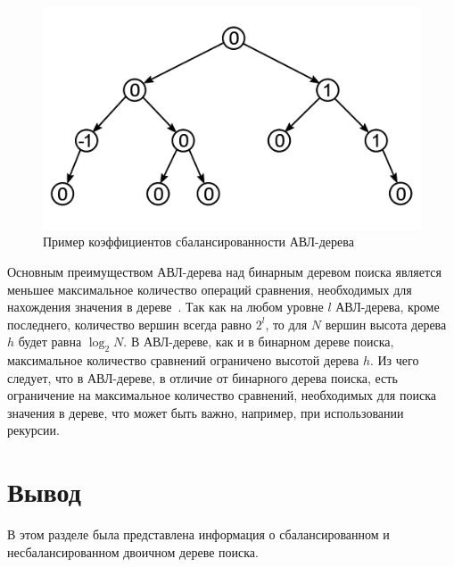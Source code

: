 \begin{figure}[h]
	\centering
	\includegraphics[height=0.3\textheight]{img/avl-tree.png}
	\caption{Пример коэффициентов сбалансированности АВЛ-дерева}
	\label{fig:avl_tree_example}
\end{figure}

Основным преимуществом АВЛ-дерева над бинарным деревом поиска является меньшее максимальное количество операций сравнения, необходимых для нахождения значения в дереве~\cite{skien}.
Так как на любом уровне $l$ АВЛ-дерева, кроме последнего, количество вершин всегда равно $2^l$, то для $N$ вершин высота дерева $h$ будет равна $\log_2 N$.
В АВЛ-дереве, как и в бинарном дереве поиска, максимальное количество сравнений ограничено высотой дерева $h$.
Из чего следует, что в АВЛ-дереве, в отличие от бинарного дерева поиска, есть ограничение на максимальное количество сравнений, необходимых для поиска значения в дереве, что может быть важно, например, при использовании рекурсии.


\section*{Вывод}

В этом разделе была представлена информация о сбалансированном и несбалансированном двоичном дереве поиска.
